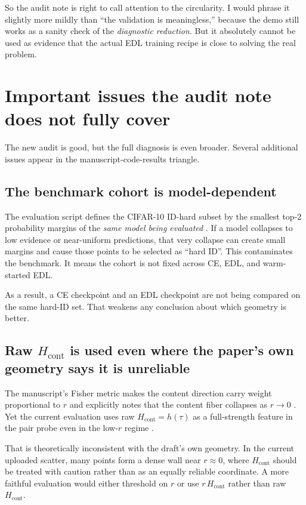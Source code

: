 \documentclass[11pt]{article}
\begin{document}
So the audit note is right to call attention to the circularity. I would phrase it slightly more mildly than ``the validation is meaningless,'' because the demo still works as a sanity check of the \emph{diagnostic reduction}. But it absolutely cannot be used as evidence that the actual EDL training recipe is close to solving the real problem.

\section{Important issues the audit note does not fully cover}

The new audit is good, but the full diagnosis is even broader. Several additional issues appear in the manuscript-code-results triangle.

\subsection{The benchmark cohort is model-dependent}

The evaluation script defines the CIFAR-10 ID-hard subset by the smallest top-2 probability margins of the \emph{same model being evaluated} \cite{eval,draft}. If a model collapses to low evidence or near-uniform predictions, that very collapse can create small margins and cause those points to be selected as ``hard ID''. This contaminates the benchmark. It means the cohort is not fixed across CE, EDL, and warm-started EDL.

As a result, a CE checkpoint and an EDL checkpoint are not being compared on the same hard-ID set. That weakens any conclusion about which geometry is better.

\subsection{Raw $H_{\mathrm{cont}}$ is used even where the paper's own geometry says it is unreliable}

The manuscript's Fisher metric makes the content direction carry weight proportional to $r$ and explicitly notes that the content fiber collapses as $r\to 0$ \cite{draft}. Yet the current evaluation uses raw $H_{\mathrm{cont}}=h(\tau)$ as a full-strength feature in the pair probe even in the low-$r$ regime \cite{utils,eval}.

That is theoretically inconsistent with the draft's own geometry. In the current uploaded scatter, many points form a dense wall near $r\approx 0$, where $H_{\mathrm{cont}}$ should be treated with caution rather than as an equally reliable coordinate. A more faithful evaluation would either threshold on $r$ or use $r\,H_{\mathrm{cont}}$ rather than raw $H_{\mathrm{cont}}$.
\end{document}
